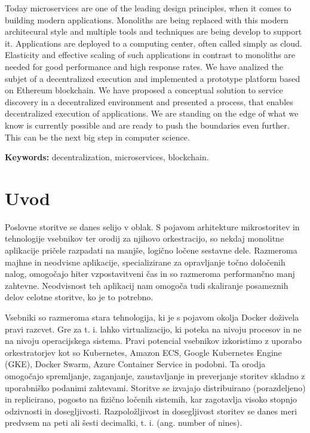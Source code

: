 \documentclass[a4paper, 12pt]{book}
\newcommand{\tkeywordsEn}{decentralization, microservices, blockchain}
\newcommand{\clearemptydoublepage}{\newpage{\pagestyle{empty}\cleardoublepage}}
\begin{document}
Today microservices are one of the leading design principles, when it comes to building modern applications.
Monoliths are being replaced with this modern architecural style and multiple tools and techniques are being develop to support it.
Applications are deployed to a computing center, often called simply as cloud.
Elasticity and effective scaling of such applications in contrast to monoliths are needed for good performance and high response rates.
We have analized the subjet of a decentralized execution and implemented a prototype platform based on Ethereum blockchain.
We have proposed a conceptual solution to service discovery in a decentralized environment and presented a process, that enables decentralized execution of applications.
We are standing on the edge of what we know is currently possible and are ready to push the boundaries even further. This can be the next big step in computer science.

\bigskip

\noindent\textbf{Keywords:} \tkeywordsEn.
\clearemptydoublepage

\mainmatter
\setcounter{page}{1}
\pagestyle{fancy}

\chapter{Uvod}
Poslovne storitve se danes selijo v oblak.
S pojavom arhitekture mikrostoritev in tehnologije vsebnikov ter orodij za njihovo orkestracijo, so nekdaj monolitne aplikacije  pričele razpadati na manjše, logično ločene sestavne dele.
Razmeroma majhne in neodvisne aplikacije, specializirane za opravljanje točno določenih nalog, omogočajo hiter vzpostavitveni čas in so razmeroma performančno manj zahtevne.
Neodvisnost teh aplikacij nam omogoča tudi skaliranje posameznih delov celotne storitve, ko je to potrebno.

Vsebniki so razmeroma stara tehnologija, ki je s pojavom okolja Docker doživela pravi razcvet.
Gre za t. i. lahko virtualizacijo, ki poteka na nivoju procesov in ne na nivoju operacijskega sistema.
Pravi potencial vsebnikov izkoristimo z uporabo orkestratorjev kot so Kubernetes, Amazon ECS, Google Kubernetes Engine (GKE), Docker Swarm, Azure Container Service in podobni.
Ta orodja omogočajo spremljanje, zaganjanje, zaustavljanje in preverjanje storitev skladno z uporabniško podanimi zahtevami.
Storitve se izvajajo distribuirano (porazdeljeno) in replicirano, pogosto na fizično ločenih sistemih, kar zagotavlja visoko stopnjo odzivnosti in dosegljivosti. Razpoložljivost in dosegljivost storitev se danes meri predvsem na peti ali šesti decimalki, t. i.  (ang. number of nines).
\end{document}
